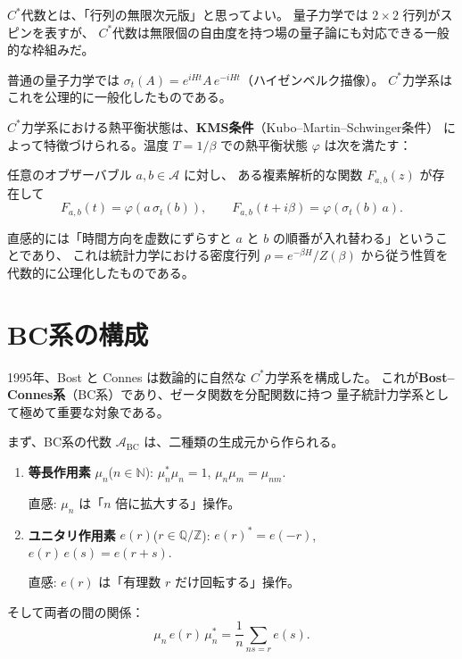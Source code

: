 \documentclass[11pt,a4paper]{article}
\theoremstyle{definition}
\newcommand{\Z}{\mathbb{Z}}
\newcommand{\Q}{\mathbb{Q}}
\newcommand{\N}{\mathbb{N}}
\begin{document}
\begin{hsbox}
$C^*$代数とは、「行列の無限次元版」と思ってよい。
量子力学では $2\times 2$ 行列がスピンを表すが、
$C^*$代数は無限個の自由度を持つ場の量子論にも対応できる一般的な枠組みだ。

普通の量子力学では $\sigma_t(A) = e^{iHt} A \, e^{-iHt}$（ハイゼンベルク描像）。
$C^*$力学系はこれを公理的に一般化したものである。
\end{hsbox}

$C^*$力学系における熱平衡状態は、\textbf{KMS条件}（Kubo--Martin--Schwinger条件）
によって特徴づけられる。温度 $T = 1/\beta$ での熱平衡状態 $\varphi$ は次を満たす：

任意のオブザーバブル $a, b \in \mathcal{A}$ に対し、
ある複素解析的な関数 $F_{a,b}(z)$ が存在して
\[
  F_{a,b}(t) = \varphi(a\,\sigma_t(b)), \qquad
  F_{a,b}(t + i\beta) = \varphi(\sigma_t(b)\, a).
\]

直感的には「時間方向を虚数にずらすと $a$ と $b$ の順番が入れ替わる」ということであり、
これは統計力学における密度行列 $\rho = e^{-\beta H}/Z(\beta)$ から従う性質を
代数的に公理化したものである。

\section{BC系の構成}
\label{sec:2.2}

1995年、Bost と Connes は数論的に自然な $C^*$力学系を構成した。
これが\textbf{Bost--Connes系}（BC系）であり、ゼータ関数を分配関数に持つ
量子統計力学系として極めて重要な対象である。

まず、BC系の代数 $\mathcal{A}_{\mathrm{BC}}$ は、二種類の生成元から作られる。

\begin{dfnbox}[BC系の生成元]
\begin{enumerate}
  \item \textbf{等長作用素} $\mu_n$\;($n\in\N$): $\mu_n^* \mu_n = 1$,\;
        $\mu_n \mu_m = \mu_{nm}$.

        直感: $\mu_n$ は「$n$ 倍に拡大する」操作。
  \item \textbf{ユニタリ作用素} $e(r)$\;($r\in\Q/\Z$): $e(r)^* = e(-r)$,\;
        $e(r)\,e(s) = e(r+s)$.

        直感: $e(r)$ は「有理数 $r$ だけ回転する」操作。
\end{enumerate}
そして両者の間の関係：
\[
  \mu_n \, e(r) \, \mu_n^* = \frac{1}{n}\sum_{ns=r} e(s).
\]
\end{dfnbox}
\end{document}
